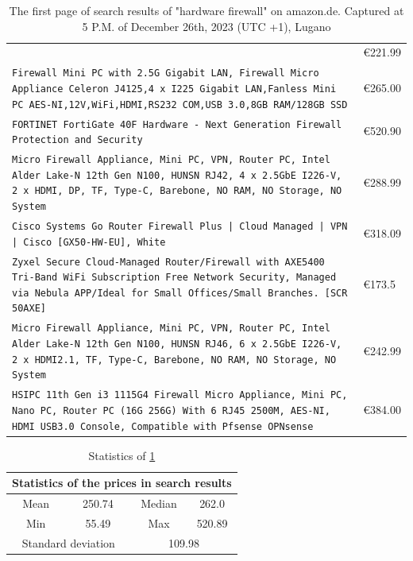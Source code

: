 \documentclass[mscthesis]{usiinfthesis}
\begin{document}
\begin{table}[H]
\begin{tabular}{|p{113mm}|p{12mm}|}
{    }    & €221.99 \\
    \texttt{Firewall Mini PC with 2.5G Gigabit LAN, Firewall Micro Appliance Celeron J4125,4 x I225 Gigabit LAN,Fanless Mini PC AES-NI,12V,WiFi,HDMI,RS232 COM,USB 3.0,8GB RAM/128GB SSD
    }    & €265.00 \\
    \texttt{FORTINET FortiGate 40F Hardware - Next Generation Firewall Protection and Security
    }    & €520.90 \\
    \texttt{Micro Firewall Appliance, Mini PC, VPN, Router PC, Intel Alder Lake-N 12th Gen N100, HUNSN RJ42, 4 x 2.5GbE I226-V, 2 x HDMI, DP, TF, Type-C, Barebone, NO RAM, NO Storage, NO System
    }    & €288.99 \\
    \texttt{Cisco Systems Go Router Firewall Plus | Cloud Managed | VPN | Cisco [GX50-HW-EU], White
    }    & €318.09 \\
    \texttt{Zyxel Secure Cloud-Managed Router/Firewall with AXE5400 Tri-Band WiFi Subscription Free Network Security, Managed via Nebula APP/Ideal for Small Offices/Small Branches. [SCR 50AXE]
    }    & €173.5  \\
    \texttt{Micro Firewall Appliance, Mini PC, VPN, Router PC, Intel Alder Lake-N 12th Gen N100, HUNSN RJ46, 6 x 2.5GbE I226-V, 2 x HDMI2.1, TF, Type-C, Barebone, NO RAM, NO Storage, NO System
    }    & €242.99 \\
    \texttt{HSIPC 11th Gen i3 1115G4 Firewall Micro Appliance, Mini PC, Nano PC, Router PC (16G 256G) With 6 RJ45 2500M, AES-NI, HDMI USB3.0 Console, Compatible with Pfsense OPNsense
    }    & €384.00 \\
    \hline
  \end{tabular}
  \caption{The first page of search results of "hardware firewall" on amazon.de. Captured at 5 P.M. of December 26th, 2023 (UTC +1), Lugano}
  \label{tab:amazon-search}
\end{table}

\begin{table}[H]
  \centering
  \begin{tabular}{|c|c|c|c|}
    \hline
    \multicolumn{4}{|c|}{Statistics of the prices in search results}                         \\
    \hline
    Mean                                     & 250.74                      & Median & 262.0  \\
    \hline
    Min                                      & 55.49                       & Max    & 520.89 \\
    \hline
    \multicolumn{2}{|c|}{Standard deviation} & \multicolumn{2}{c|}{109.98}                   \\
    \hline
  \end{tabular}
  \caption{Statistics of \cref{tab:amazon-search}}
  \label{tab:amazon-search-stat}
\end{table}
\end{document}
